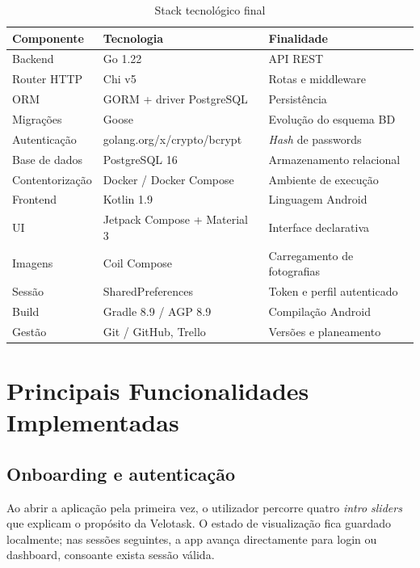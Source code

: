 \documentclass[12pt,a4paper]{article}
\begin{document}
\begin{table}[H]
\centering
\caption{Stack tecnológico final}
\begin{tabular}{|p{3.5cm}|p{4cm}|p{6.5cm}|}
\hline
\textbf{Componente} & \textbf{Tecnologia} & \textbf{Finalidade}\\
\hline
Backend & Go 1.22 & API REST\\
\hline
Router HTTP & Chi v5 & Rotas e middleware\\
\hline
ORM & GORM + driver PostgreSQL & Persistência\\
\hline
Migrações & Goose & Evolução do esquema BD\\
\hline
Autenticação & golang.org/x/crypto/bcrypt & \textit{Hash} de passwords\\
\hline
Base de dados & PostgreSQL 16 & Armazenamento relacional\\
\hline
Contentorização & Docker / Docker Compose & Ambiente de execução\\
\hline
Frontend & Kotlin 1.9 & Linguagem Android\\
\hline
UI & Jetpack Compose + Material 3 & Interface declarativa\\
\hline
Imagens & Coil Compose & Carregamento de fotografias\\
\hline
Sessão & SharedPreferences & Token e perfil autenticado\\
\hline
Build & Gradle 8.9 / AGP 8.9 & Compilação Android\\
\hline
Gestão & Git / GitHub, Trello & Versões e planeamento\\
\hline
\end{tabular}
\end{table}

\section{Principais Funcionalidades Implementadas}

\subsection{Onboarding e autenticação}

Ao abrir a aplicação pela primeira vez, o utilizador percorre quatro \textit{intro sliders} que explicam o propósito da Velotask. O estado de visualização fica guardado localmente; nas sessões seguintes, a app avança directamente para login ou dashboard, consoante exista sessão válida.
\end{document}
